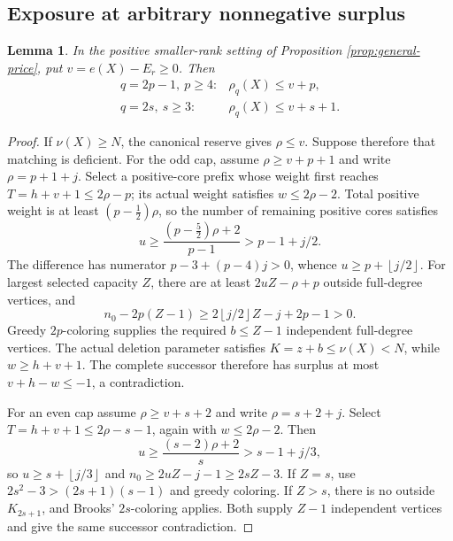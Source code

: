 \documentclass[11pt,a4paper]{article}
\newcommand{\floor}[1]{\left\lfloor#1\right\rfloor}
\newtheorem{lemma}[theorem]{Lemma}
\theoremstyle{definition}
\begin{document}
\subsection{Exposure at arbitrary nonnegative surplus}
\begin{lemma}\label{lem:surplus-price}
In the positive smaller-rank setting of Proposition \ref{prop:general-price}, put $v=e(X)-E_r\ge0$. Then
\[
\begin{array}{ll}
q=2p-1,\ p\ge4:&\rho_q(X)\le v+p,\\
q=2s,\ s\ge3:&\rho_q(X)\le v+s+1.
\end{array}
\]
\end{lemma}
\begin{proof}
If $\nu(X)\ge N$, the canonical reserve gives $\rho\le v$. Suppose therefore that matching is deficient. For the odd cap, assume $\rho\ge v+p+1$ and write $\rho=p+1+j$. Select a positive-core prefix whose weight first reaches $T=h+v+1\le2\rho-p$; its actual weight satisfies $w\le2\rho-2$. Total positive weight is at least $(p-\tfrac12)\rho$, so the number of remaining positive cores satisfies
\[
u\ge\frac{(p-\tfrac52)\rho+2}{p-1}>p-1+j/2.
\]
The difference has numerator $p-3+(p-4)j>0$, whence $u\ge p+\floor{j/2}$. For largest selected capacity $Z$, there are at least $2uZ-\rho+p$ outside full-degree vertices, and
\[
n_0-2p(Z-1)\ge2\floor{j/2}Z-j+2p-1>0.
\]
Greedy $2p$-coloring supplies the required $b\le Z-1$ independent full-degree vertices. The actual deletion parameter satisfies $K=z+b\le\nu(X)<N$, while $w\ge h+v+1$. The complete successor therefore has surplus at most $v+h-w\le-1$, a contradiction.

For an even cap assume $\rho\ge v+s+2$ and write $\rho=s+2+j$. Select $T=h+v+1\le2\rho-s-1$, again with $w\le2\rho-2$. Then
\[
u\ge\frac{(s-2)\rho+2}{s}>s-1+j/3,
\]
so $u\ge s+\floor{j/3}$ and $n_0\ge2uZ-j-1\ge2sZ-3$. If $Z=s$, use $2s^2-3>(2s+1)(s-1)$ and greedy coloring. If $Z>s$, there is no outside $K_{2s+1}$, and Brooks' $2s$-coloring applies. Both supply $Z-1$ independent vertices and give the same successor contradiction.
\end{proof}
\end{document}
